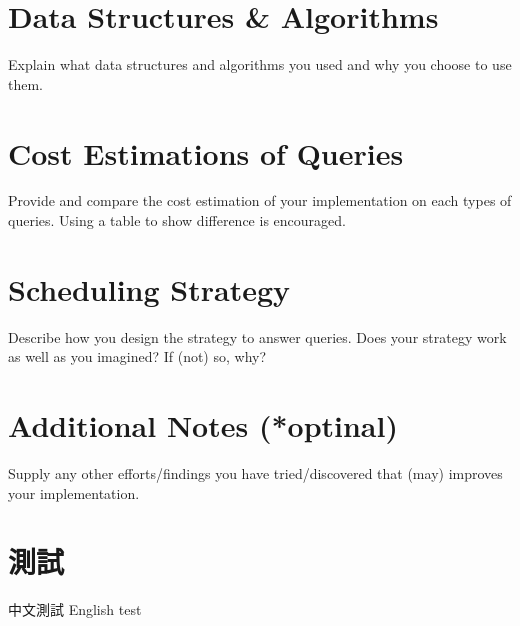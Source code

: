 \documentclass{article}
\begin{document}
\section{Data Structures \& Algorithms}
Explain what data structures and algorithms you used and why you choose to use them.

\section{Cost Estimations of Queries}
Provide and compare the cost estimation of your implementation on each types of queries. Using a table to show difference is encouraged.

\section{Scheduling Strategy}
Describe how you design the strategy to answer queries. Does your strategy work as well as you imagined? If (not) so, why?

\section{Additional Notes (*optinal)}
Supply any other efforts/findings you have tried/discovered that (may) improves your implementation.


\section{測試}
中文測試 English test
\end{document}

